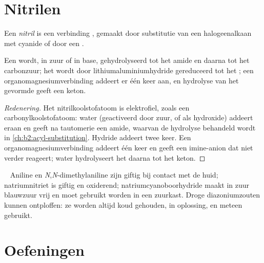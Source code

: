 \section{Nitrilen}

\begin{definition}[Nitril]\label{def:b2:amines:nitrile}
Een \emph{nitril} is een verbinding , gemaakt door substitutie van een halogeenalkaan
met cyanide of door een .
\end{definition}

\begin{proposition}\label{prop:b2:amines:nitrile}
Een  wordt, in zuur of in base, gehydrolyseerd tot het amide en daarna tot het carbonzuur; het wordt
door lithiumaluminiumhydride gereduceerd tot het  ; een organomagnesiumverbinding
addeert er één keer aan, en hydrolyse van het gevormde  geeft een keton.
\end{proposition}

\begin{proof}[Redenering]
Het nitrilkoolstofatoom is elektrofiel, zoals een carbonylkoolstofatoom: water (geactiveerd door zuur, of als
hydroxide) addeert eraan en geeft na tautomerie een amide, waarvan de hydrolyse behandeld wordt in
\cref{ch:b2:acyl-substitution}. Hydride addeert twee keer. Een organomagnesiumverbinding addeert één keer
en geeft een imine-anion dat niet verder reageert; water hydrolyseert het  daarna tot het keton.
\end{proof}

\begin{safety}{\,\,\,}
Aniline en \textit{N},\textit{N}-dimethylaniline zijn giftig bij contact met de huid; natriumnitriet is
giftig en oxiderend; natriumcyanoboorhydride maakt in zuur blauwzuur vrij en moet gebruikt worden
in een zuurkast. Droge diazoniumzouten kunnen ontploffen: ze worden altijd koud gehouden, in oplossing, en meteen
gebruikt.
\end{safety}

\section{Oefeningen}

